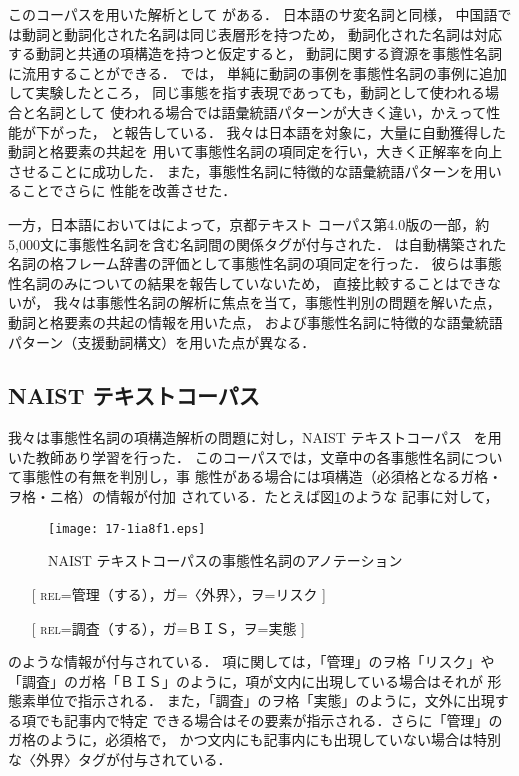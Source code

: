 \documentclass[japanese]{jnlp_1.4}
\begin{document}
このコーパスを用いた解析として
\cite{pradhan:2004:NAACL-HLT,xue:2006:HLT-NAACL}がある．
日本語のサ変名詞と同様，
中国語では動詞と動詞化された名詞は同じ表層形を持つため，
動詞化された名詞は対応する動詞と共通の項構造を持つと仮定すると，
動詞に関する資源を事態性名詞に流用することができる．
\cite{xue:2006:HLT-NAACL} では，
単純に動詞の事例を事態性名詞の事例に追加して実験したところ，
同じ事態を指す表現であっても，動詞として使われる場合と名詞として
使われる場合では語彙統語パターンが大きく違い，かえって性能が下がった，
と報告している．
我々は日本語を対象に，大量に自動獲得した動詞と格要素の共起を
用いて事態性名詞の項同定を行い，大きく正解率を向上させることに成功した．
また，事態性名詞に特徴的な語彙統語パターンを用いることでさらに
性能を改善させた．

一方，日本語においては\cite{kurohashi:2005}によって，京都テキスト
コーパス第4.0版の一部，約5,000文に事態性名詞を含む名詞間の関係タグが付与された．
\cite{sasano:2005:NLJ}は自動構築された
名詞の格フレーム辞書の評価として事態性名詞の項同定を行った．
彼らは事態性名詞のみについての結果を報告していないため，
直接比較することはできないが，
我々は事態性名詞の解析に焦点を当て，事態性判別の問題を解いた点，
動詞と格要素の共起の情報を用いた点，
および事態性名詞に特徴的な語彙統語パターン（支援動詞構文）を用いた点が異なる．



\subsection{NAIST テキストコーパス}


我々は事態性名詞の項構造解析の問題に対し，NAIST テキストコーパス~
\cite{iida:2007:NL} を用いた教師あり学習を行った．
このコーパスでは，文章中の各事態性名詞について事態性の有無を判別し，事
態性がある場合には項構造（必須格となるガ格・ヲ格・ニ格）の情報が付加
されている．たとえば図\ref{fig:naisttextcorpus}のような
記事に対して，

\begin{figure}[b]
\begin{center}
\texttt{[image: 17-1ia8f1.eps]}
\end{center}
\caption{NAIST テキストコーパスの事態性名詞のアノテーション}
\label{fig:naisttextcorpus}
\end{figure}

\begin{itemize}
\item[] [ \textsc{rel}=管理（する），ガ=〈外界〉，ヲ=リスク ]
\item[] [ \textsc{rel}=調査（する），ガ=ＢＩＳ，ヲ=実態 ]
\end{itemize}
のような情報が付与されている．
項に関しては，「管理」のヲ格「リスク」や
「調査」のガ格「ＢＩＳ」のように，項が文内に出現している場合はそれが
形態素単位で指示される．
また，「調査」のヲ格「実態」のように，文外に出現する項でも記事内で特定
できる場合はその要素が指示される．さらに「管理」のガ格のように，必須格で，
かつ文内にも記事内にも出現していない場合は特別な〈外界〉タグが付与されている．
\end{document}
